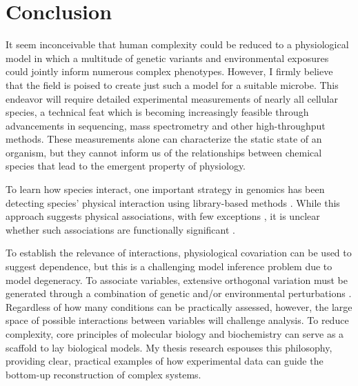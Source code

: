 \section{Conclusion}

It seem inconceivable that human complexity could be reduced to a physiological model in which a multitude of genetic variants and environmental exposures could jointly inform numerous complex phenotypes. However, I firmly believe that the field is poised to create just such a model for a suitable microbe. This endeavor will require detailed experimental measurements of nearly all cellular species, a technical feat which is becoming increasingly feasible through advancements in sequencing, mass spectrometry and other high-throughput methods. These measurements alone can characterize the static state of an organism, but they cannot inform us of the relationships between chemical species that lead to the emergent property of physiology. 

To learn how species interact, one important strategy in genomics has been detecting species' physical interaction using library-based methods \cite{LiebermanAiden:2009jz, Fields:1989dm, Orsak:2012ci, Johnson:2007fh}.  While this approach suggests physical associations, with few exceptions \cite{Reynolds:2011gs}, it is unclear whether such associations are functionally significant \cite{Nandy:2010ej, Scheer:2011df}. 

To establish the relevance of interactions, physiological covariation can be used to suggest dependence, but this is a challenging model inference problem due to model degeneracy. To associate variables, extensive orthogonal variation must be generated through a combination of genetic and/or environmental perturbations \cite{Greenberg:2011jf}. Regardless of how many conditions can be practically assessed, however, the large space of possible interactions between variables will challenge analysis. To reduce complexity, core principles of molecular biology and biochemistry can serve as a scaffold to lay biological models. My thesis research espouses this philosophy, providing clear, practical examples of how experimental data can guide the bottom-up reconstruction of complex systems.

